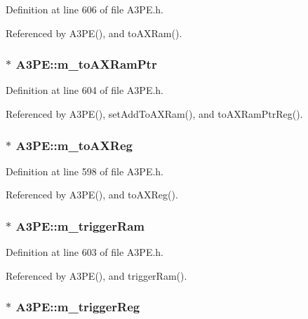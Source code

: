 Definition at line 606 of file A3PE.h.

Referenced by A3PE(), and toAXRam().\hypertarget{classA3PE_aae1b8b2e96bba94535bd4de766bd7e65}{
\subsubsection[{m\_\-toAXRamPtr}]{$\ast$ {\bf A3PE::m\_\-toAXRamPtr}}}
\label{classA3PE_aae1b8b2e96bba94535bd4de766bd7e65}


Definition at line 604 of file A3PE.h.

Referenced by A3PE(), setAddToAXRam(), and toAXRamPtrReg().\hypertarget{classA3PE_abe8eb76e3c0d967403726143deb1b70f}{
\subsubsection[{m\_\-toAXReg}]{$\ast$ {\bf A3PE::m\_\-toAXReg}}}
\label{classA3PE_abe8eb76e3c0d967403726143deb1b70f}


Definition at line 598 of file A3PE.h.

Referenced by A3PE(), and toAXReg().\hypertarget{classA3PE_a2b40e3937f0aa008ec7073acc5029fcc}{
\subsubsection[{m\_\-triggerRam}]{$\ast$ {\bf A3PE::m\_\-triggerRam}}}
\label{classA3PE_a2b40e3937f0aa008ec7073acc5029fcc}


Definition at line 603 of file A3PE.h.

Referenced by A3PE(), and triggerRam().\hypertarget{classA3PE_a750158ae488121ab7969452f061e678c}{
\subsubsection[{m\_\-triggerReg}]{$\ast$ {\bf A3PE::m\_\-triggerReg}}}
\label{classA3PE_a750158ae488121ab7969452f061e678c}


